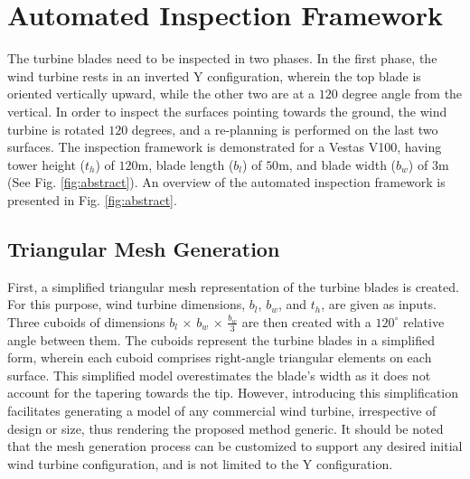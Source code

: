 \documentclass[letterpaper, 10 pt, conference]{ieeeconf}  %
\begin{document}
\section{Automated Inspection Framework}
\label{sec:methodology}
The turbine blades need to be inspected in two phases. In the first phase, the wind turbine rests in an inverted Y configuration, wherein the top blade is oriented vertically upward, while the other two are at a $120$ degree angle from the vertical. In order to inspect the surfaces pointing towards the ground, the wind turbine is rotated $120$ degrees, and a re-planning is performed on the last two surfaces. The inspection framework is demonstrated for a Vestas V100, having tower height ($t_h$) of $120$m, blade length ($b_l$) of $50$m, and blade width ($b_w$) of $3$m (See Fig. \ref{fig:abstract}).
An overview of the automated inspection framework is presented in Fig. \ref{fig:abstract}.



\subsection{Triangular Mesh Generation}



First, a simplified triangular mesh representation of the turbine blades is created. For this purpose,  wind turbine dimensions, $b_l$, $b_w$, and $t_h$, are given as inputs. Three cuboids of dimensions $b_l$ $\times$ $b_w$ $\times$ $\frac{b_w}{3}$ are then created with a $120^{\circ}$ relative angle between them. The cuboids represent the turbine blades in a simplified form, wherein each cuboid comprises right-angle triangular elements on each surface.  This simplified model overestimates the blade's width as it does not account for the tapering towards the tip. However, introducing this simplification facilitates generating a model of any commercial wind turbine, irrespective of design or size, thus rendering the proposed method generic. It should be noted that the mesh generation process can be customized to support any desired initial wind turbine configuration, and is not limited to the Y configuration. %
\end{document}
